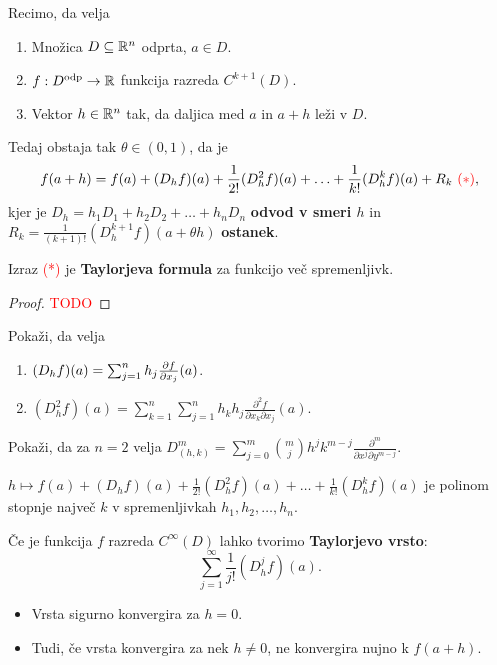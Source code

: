 \begin{izrek}
    Recimo, da velja
    \begin{enumerate}
        \item Množica $D \subseteq \mathbb{R}^n$ odprta, $a \in D$.
        \item $f: D^{\text{odp}} \to \mathbb{R}$ funkcija razreda $C^{k+1}(D)$.
        \item Vektor $h \in \mathbb{R}^n$ tak, da daljica med $a$ in $a+h$ leži v $D$.
    \end{enumerate}
    Tedaj obstaja tak $\theta \in (0,1)$, da je 
    $$f(a+h) = f(a) + (D_hf)(a) + \frac{1}{2!}(D_h^2f)(a) + \ldots + \frac{1}{k!} (D_h^kf)(a) + R_k \ \textcolor{red}{(*)},$$
    kjer je $D_h = h_1D_1 + h_2D_2 + \ldots + h_nD_n$ \textbf{odvod v smeri $h$} in $R_k = \frac{1}{(k+1)!} (D_h^{k+1}f)(a + \theta h)$ \textbf{ostanek}.

    Izraz \textcolor{red}{(*)} je \textbf{Taylorjeva formula} za funkcijo več spremenljivk.
\end{izrek}

\begin{proof}
    \textcolor{red}{TODO}
\end{proof}

\begin{opomba}
    Pokaži, da velja
    \begin{enumerate}
        \item $(D_hf)(a) = \sum_{j=1}^{n}h_j \frac{\partial f}{\partial x_j}(a)$.
        \item $(D_h^2f)(a) = \sum_{k=1}^{n} \sum_{j=1}^{n}h_kh_j \frac{\partial^2f}{\partial x_k \partial x_j}(a)$. 
    \end{enumerate}
\end{opomba}

\begin{primer}
    Pokaži, da za $n=2$ velja $D_{(h,k)}^m = \sum_{j=0}^{m} \binom{m}{j} h^j k^{m-j} \frac{\partial^m}{\partial x^j \partial y^{m-j}}$.
\end{primer}

\begin{opomba}
    $h \mapsto f(a) + (D_hf)(a) + \frac{1}{2!}(D_h^2f)(a) + \ldots + \frac{1}{k!} (D_h^kf)(a) $ je polinom stopnje največ $k$ v spremenljivkah $h_1, h_2, \ldots, h_n$.
\end{opomba}

\begin{opomba}
    Če je funkcija $f$ razreda $C^\infty(D)$ lahko tvorimo \textbf{Taylorjevo vrsto}:
    $$\sum_{j=1}^{\infty} \frac{1}{j!} (D_h^j f)(a).$$
    \begin{itemize}
        \item Vrsta sigurno konvergira za $h=0$.
        \item Tudi, če vrsta konvergira za nek $h \neq 0$, ne konvergira nujno k $f(a+h)$.
    \end{itemize}
\end{opomba}

